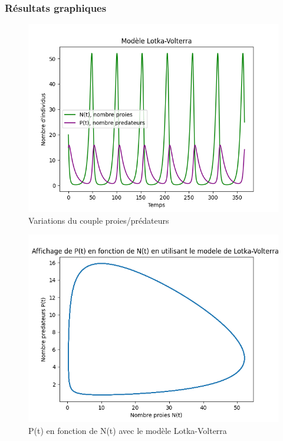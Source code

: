 \documentclass{article}
\begin{document}
\subsubsection{Résultats graphiques}
\begin{multicols}{2}

\begin{figure}[H]
\captionsetup{justification=centering}
      \includegraphics[scale=0.5]{lotka_volterra.png}
      \caption{Variations du couple proies/prédateurs}
      \label{fig:lotka_periodique}
\end{figure}

\columnbreak

 \begin{figure}[H]     
 \captionsetup{justification=centering}
      \includegraphics[scale=0.5]{P_N.png}
      \caption{P(t) en fonction de N(t) avec le modèle Lotka-Volterra}
      \label{fig:lotka}
\end{figure}

\end{multicols}
\end{document}
